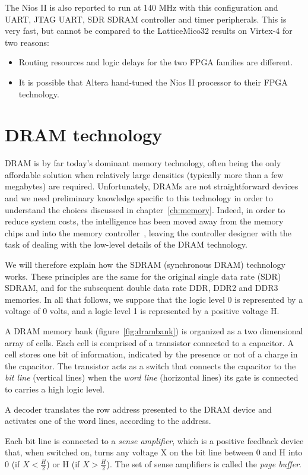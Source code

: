 \documentclass[a4paper,11pt]{kthesis}
\begin{document}
The Nios II is also reported to run at 140 MHz with this configuration and UART, JTAG UART, SDR SDRAM controller and timer peripherals. This is very fast, but cannot be compared to the LatticeMico32 results on Virtex-4 for two reasons:
\begin{itemize}
\item Routing resources and logic delays for the two FPGA families are different.
\item It is possible that Altera hand-tuned the Nios II processor to their FPGA technology.
\end{itemize}

\section{DRAM technology}
DRAM is by far today's dominant memory technology, often being the only affordable solution when relatively large densities (typically more than a few megabytes) are required. Unfortunately, DRAMs are not straightforward devices and we need preliminary knowledge specific to this technology in order to understand the choices discussed in chapter~\ref{ch:memory}. Indeed, in order to reduce system costs, the intelligence has been moved away from the memory chips and into the memory controller~\cite{dramlowcost}, leaving the controller designer with the task of dealing with the low-level details of the DRAM technology.

We will therefore explain how the SDRAM (synchronous DRAM) technology works. These principles are the same for the original single data rate (SDR) SDRAM, and for the subsequent double data rate DDR, DDR2 and DDR3 memories. In all that follows, we suppose that the logic level 0 is represented by a voltage of 0 volts, and a logic level 1 is represented by a positive voltage H.

A DRAM memory bank (figure~\ref{fig:drambank}) is organized as a two dimensional array of cells. Each cell is comprised of a transistor connected to a capacitor. A cell stores one bit of information, indicated by the presence or not of a charge in the capacitor. The transistor acts as a switch that connects the capacitor to the \textit{bit line} (vertical lines) when the \textit{word line} (horizontal lines) its gate is connected to carries a high logic level.

A decoder translates the row address presented to the DRAM device and activates one of the word lines, according to the address.

Each bit line is connected to a \textit{sense amplifier}, which is a positive feedback device that, when switched on, turns any voltage X on the bit line between 0 and H into 0 (if $X < \frac{H}{2}$) or H (if $X > \frac{H}{2}$). The set of sense amplifiers is called the \textit{page buffer}.
\end{document}
